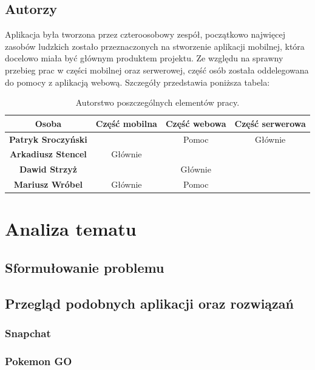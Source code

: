 \documentclass[a4paper,twoside,12pt]{book}
\begin{document}
\newpage

\section{Autorzy}
Aplikacja była tworzona przez czteroosobowy zespół, początkowo najwięcej zasobów ludzkich zostało przeznaczonych na stworzenie aplikacji mobilnej, która docelowo miała być głównym produktem projektu. Ze względu na sprawny przebieg prac w części mobilnej oraz serwerowej, część osób została oddelegowana do pomocy z aplikacją webową. Szczegóły przedstawia poniższa tabela:
\begin{table}[ht]
\centering
\begin{tabular}{|c|c|c|c|}
\hline
\textbf{Osoba} & \textbf{Część mobilna} & \textbf{Część webowa} & \textbf{Część serwerowa} \\ \hline
\textbf{Patryk Sroczyński}    &               & Pomoc            & Głównie      \\ \hline
\textbf{Arkadiusz Stencel}    & Głównie       &                  &              \\ \hline
\textbf{Dawid Strzyż}         &               & Głównie          &              \\ \hline
\textbf{Mariusz Wróbel}       & Głównie       & Pomoc            &              \\ \hline
\end{tabular}
\caption{Autorstwo poszczególnych elementów pracy.}
\end{table}


\chapter{Analiza tematu}

\section{Sformułowanie problemu}
\section{Przegląd podobnych aplikacji oraz rozwiązań}
\subsection{Snapchat}

\subsection{Pokemon GO}
\end{document}
